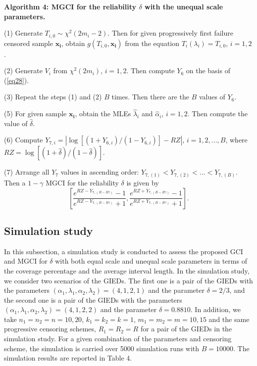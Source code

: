 \documentclass[12pt]{article}
\begin{document}
{\bf Algorithm 4: MGCI for the reliability $\delta$ with the unequal scale parameters.}

(1) Generate $T_{i,0} \sim \chi^2(2m_i-2)$. Then for given progressively first failure censored sample $\mathbf{x_i}$, obtain $g(T_{i,0},\mathbf{x_i})$ from the equation $T_i(\lambda_i)=T_{i,0}$, $i=1,2$.

(2) Generate $V_i$ from $\chi^2(2m_i)$, $i=1,2$. Then compute $Y_6$ on the basis of (\ref{eq28}).

(3) Repeat the steps (1) and (2) $B$ times. Then there are the $B$ values of $Y_6$.

(5) For given sample $\mathbf{x_i}$, obtain the MLEs $\widehat{\lambda}_i$ and $\widehat{\alpha}_i$, $i=1,2$. Then compute the value of $\widehat{\delta}$.

(6) Compute $Y_{7,i}=|\log[(1+Y_{6,i})/(1-Y_{6,i})]-RZ|$, $i=1,2,...,B$, where $RZ=\log[(1+\widehat{\delta})/(1-\widehat{\delta})]$.

(7) Arrange all $Y_7$ values in ascending order: $Y_{7,(1)}<Y_{7,(2)}<...<Y_{7,(B)}$. Then a $1-\gamma$ MGCI for the reliability $\delta$ is given by $$\left[\frac{e^{RZ-Y_{7,(B-B\gamma)}}-1}{e^{RZ-Y_{7,(B-B\gamma)}}+1}, \frac{e^{RZ+Y_{7,(B-B\gamma)}}-1}{e^{RZ+Y_{7,(B-B\gamma)}}+1}\right].$$








\subsection{Simulation study}

In this subsection, a simulation study is conducted to assess the proposed GCI and MGCI for $\delta$ with both equal scale and unequal scale parameters in terms of the coverage percentage and the average interval length.
In the simulation study, we consider two scenarios of the GIEDs. The first one is a pair of the GIEDs with the parameters $(\alpha_1, \lambda_1, \alpha_2, \lambda_2) = (4, 1, 2, 1)$ and the parameter $\delta=2/3$, and the second one is a pair of the GIEDs with the parameters $(\alpha_1, \lambda_1, \alpha_2, \lambda_2) = (4, 1, 2, 2)$ and the parameter
$\delta=0.8810$. In addition, we take $n_1=n_2=n=10, 20$, $k_1 =k_2=k=1$, $m_1=m_2=m=10, 15$ and the same progressive censoring schemes, $R_1=R_2=R$ for a pair of the GIEDs in the simulation study. For a given combination of the parameters and censoring scheme, the simulation is carried over 5000 simulation runs with $B=10000$. The simulation results are reported in Table 4.
\end{document}
